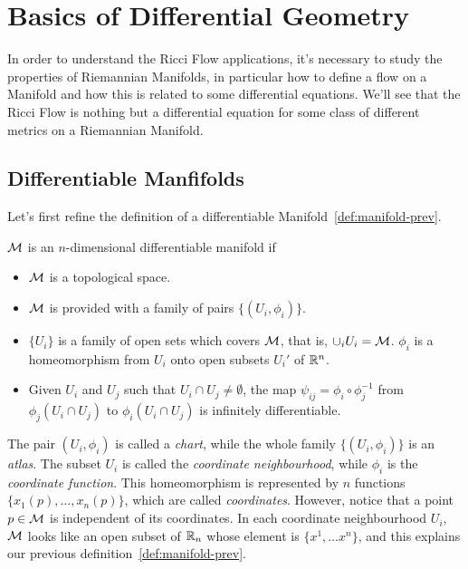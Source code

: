 \section{Basics of Differential Geometry}
In order to understand the Ricci Flow applications, it's necessary to study the properties of Riemannian Manifolds, in particular how to define a flow on a Manifold and how this is related to some differential equations. We'll see that the Ricci Flow is nothing but a differential equation for some class of different metrics on a Riemannian Manifold.


\subsection{Differentiable Manfifolds}
Let's first refine the definition of a differentiable Manifold~\ref{def:manifold-prev}.

\begin{definition}
    $\mathcal{M}$ is an $n$-dimensional differentiable manifold if
    \begin{itemize}
        \item $\mathcal{M}$ is a topological space.
        \item $\mathcal{M}$ is provided with a family of pairs $\{ (U_i, \phi_i) \}$.
        \item $\{U_i\}$ is a family of open sets which covers $\mathcal{M}$, that is, $\cup_i U_i = \mathcal{M}$. $\phi_i$ is a homeomorphism from $U_i$ onto open subsets $U_i'$ of $\mathbb{R}^n$.
        \item Given $U_i$ and $U_j$ such that $U_i \cap U_j \neq \emptyset$, the map $\psi_{ij} = \phi_i \circ \phi_j^{-1}$ from $\phi_j (U_i \cap U_j)$ to $\phi_i(U_i \cap U_j)$ is infinitely differentiable.
    \end{itemize}
\end{definition}

The pair $(U_i, \phi_i)$ is called a \emph{chart}, while the whole family $\{(U_i, \phi_i)\}$ is an \emph{atlas}. The subset $U_i$ is called the \emph{coordinate neighbourhood}, while $\phi_i$ is the \emph{coordinate function}. This homeomorphism is represented by $n$ functions $\{x_1(p), \dots, x_n(p)\}$, which are called \emph{coordinates}. However, notice that a point $p\in\mathcal{M}$ is independent of its coordinates. In each coordinate neighbourhood $U_i$, $\mathcal{M}$ looks like an open subset of $\mathbb{R}_n$ whose element is $\{x^1, \dots x^n\}$, and this explains our previous definition~\ref{def:manifold-prev}.

